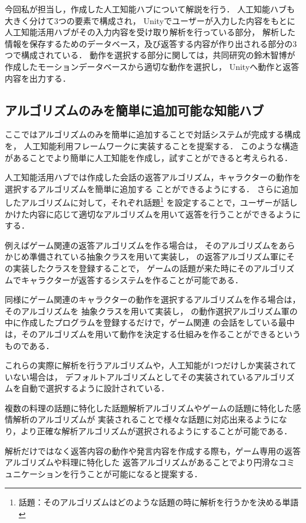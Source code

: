 今回私が担当し，作成した人工知能ハブについて解説を行う．
人工知能ハブも大きく分けて3つの要素で構成され，
Unityでユーザーが入力した内容をもとに人工知能活用ハブがその入力内容を受け取り解析を行っている部分，
解析した情報を保存するためのデータベース，及び返答する内容が作り出される部分の3つで構成されている．
動作を選択する部分に関しては，共同研究の鈴木智博が作成したモーションデータベースから適切な動作を選択し，
Unityへ動作と返答内容を出力する．

\subsection{アルゴリズムのみを簡単に追加可能な知能ハブ}
ここではアルゴリズムのみを簡単に追加することで対話システムが完成する構成を，
人工知能利用フレームワークに実装することを提案する．
このような構造があることでより簡単に人工知能を作成し，試すことができると考えられる．

人工知能活用ハブでは作成した会話の返答アルゴリズム，キャラクターの動作を選択するアルゴリズムを簡単に追加する
ことができるようにする．
さらに追加したアルゴリズムに対して，それぞれ話題\footnote{話題：そのアルゴリズムはどのような話題の時に解析を行うかを決める単語}
を設定することで，ユーザーが話しかけた内容に応じて適切なアルゴリズムを用いて返答を行うことができるようにする．

例えばゲーム関連の返答アルゴリズムを作る場合は，
そのアルゴリズムをあらかじめ準備されている抽象クラスを用いて実装し，
の返答アルゴリズム軍にその実装したクラスを登録することで，
ゲームの話題が来た時にそのアルゴリズムでキャラクターが返答するシステムを作ることが可能である．

同様にゲーム関連のキャラクターの動作を選択するアルゴリズムを作る場合は，そのアルゴリズムを
抽象クラスを用いて実装し，
の動作選択アルゴリズム軍の中に作成したプログラムを登録するだけで，ゲーム関連
の会話をしている最中は，そのアルゴリズムを用いて動作を決定する仕組みを作ることができるというものである．

これらの実際に解析を行うアルゴリズムや，人工知能が1つだけしか実装されていない場合は，
デフォルトアルゴリズムとしてその実装されているアルゴリズムを自動で選択するように設計されている．

複数の料理の話題に特化した話題解析アルゴリズムやゲームの話題に特化した感情解析のアルゴリズムが
実装されることで様々な話題に対応出来るようになり，より正確な解析アルゴリズムが選択されるようにすることが可能である．

解析だけではなく返答内容の動作や発言内容を作成する際も，ゲーム専用の返答アルゴリズムや料理に特化した
返答アルゴリズムがあることでより円滑なコミュニケーションを行うことが可能になると提案する．

